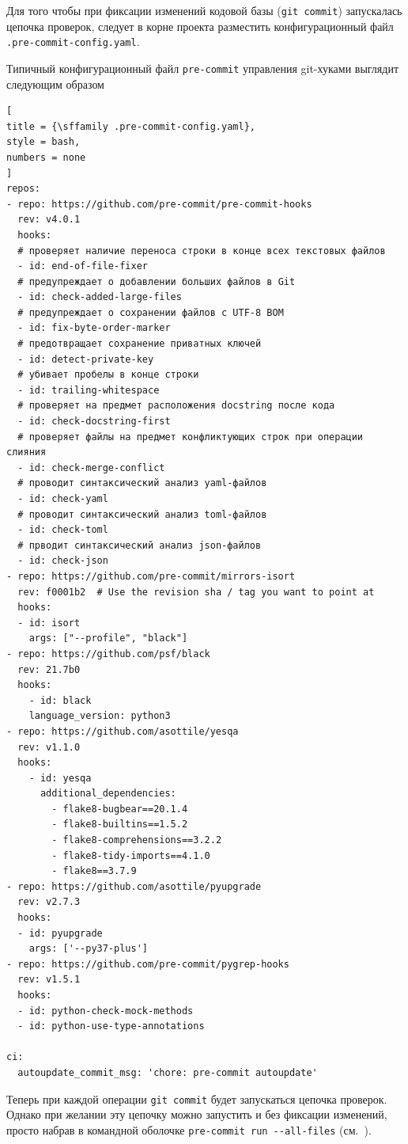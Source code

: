 \documentclass[%
	11pt,
	a4paper,
	utf8,
		]{article}
\begin{document}
Для того чтобы при фиксации изменений кодовой базы (\texttt{git commit}) запускалась цепочка проверок, следует в корне проекта разместить конфигурационный файл \texttt{.pre-commit-config.yaml}.

Типичный конфигурационный файл \texttt{pre-commit} управления git-хуками выглядит следующим образом
\begin{lstlisting}[
title = {\sffamily .pre-commit-config.yaml},
style = bash,
numbers = none
]
repos:
- repo: https://github.com/pre-commit/pre-commit-hooks
  rev: v4.0.1
  hooks:
  # проверяет наличие переноса строки в конце всех текстовых файлов
  - id: end-of-file-fixer
  # предупреждает о добавлении больших файлов в Git
  - id: check-added-large-files
  # предупреждает о сохранении файлов с UTF-8 BOM
  - id: fix-byte-order-marker
  # предотвращает сохранение приватных ключей
  - id: detect-private-key
  # убивает пробелы в конце строки
  - id: trailing-whitespace
  # проверяет на предмет расположения docstring после кода
  - id: check-docstring-first
  # проверяет файлы на предмет конфликтующих строк при операции слияния
  - id: check-merge-conflict
  # проводит синтаксический анализ yaml-файлов
  - id: check-yaml
  # проводит синтаксический анализ toml-файлов
  - id: check-toml
  # прводит синтаксический анализ json-файлов
  - id: check-json
- repo: https://github.com/pre-commit/mirrors-isort
  rev: f0001b2  # Use the revision sha / tag you want to point at
  hooks:
  - id: isort
    args: ["--profile", "black"]
- repo: https://github.com/psf/black
  rev: 21.7b0
  hooks:
    - id: black
    language_version: python3
- repo: https://github.com/asottile/yesqa
  rev: v1.1.0
  hooks:
    - id: yesqa
      additional_dependencies:
        - flake8-bugbear==20.1.4
        - flake8-builtins==1.5.2
        - flake8-comprehensions==3.2.2
        - flake8-tidy-imports==4.1.0
        - flake8==3.7.9
- repo: https://github.com/asottile/pyupgrade
  rev: v2.7.3
  hooks:
  - id: pyupgrade
    args: ['--py37-plus']
- repo: https://github.com/pre-commit/pygrep-hooks
  rev: v1.5.1
  hooks:
  - id: python-check-mock-methods
  - id: python-use-type-annotations

ci:
  autoupdate_commit_msg: 'chore: pre-commit autoupdate'
\end{lstlisting}

Теперь при каждой операции \texttt{git commit} будет запускаться цепочка проверок. Однако при желании эту цепочку можно запустить и без фиксации изменений, просто набрав в командной оболочке \verb|pre-commit run --all-files| (см.~).
\end{document}
